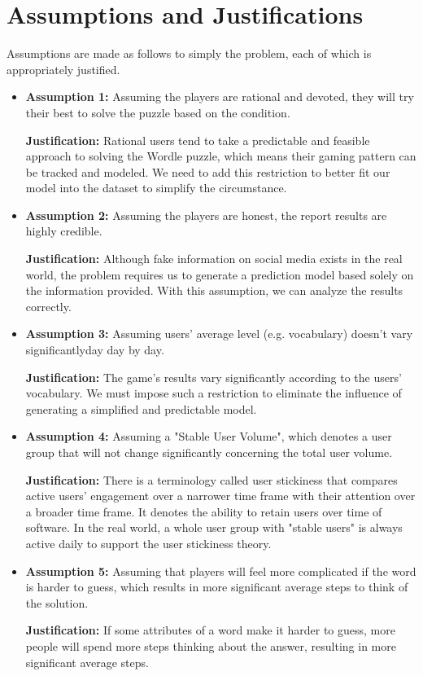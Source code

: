 \documentclass[12pt]{article}
\begin{document}
\section{Assumptions and Justifications}

Assumptions are made as follows to simply the problem, each of which is appropriately justified.

\begin{itemize}
    \item {\textbf{Assumption 1:} Assuming the players are rational and devoted, they will try their best to solve the puzzle based on the condition.}
    
    \textbf{Justification:} Rational users tend to take a predictable  and feasible approach to solving the Wordle puzzle, which means their gaming pattern can be tracked and modeled. We need to add this restriction to better fit our model into the dataset to simplify the circumstance.
    \item {\textbf{Assumption 2:} Assuming the players are honest, the report results are highly credible.}
    
    \textbf{Justification:} Although fake information on social media exists in the real world, the problem requires us to generate a prediction model based solely on the information provided. With this assumption, we can analyze the results correctly.
    \item {\textbf{Assumption 3:} Assuming users' average level (e.g. vocabulary) doesn't vary significantlyday day by day.}

    \textbf{Justification:} The game's results vary significantly according to the users' vocabulary. We must impose such a restriction to eliminate the influence of generating a simplified and predictable model.
    \item {\textbf{Assumption 4:} Assuming a "Stable User Volume", which denotes a user group that will not change significantly concerning the total user volume.}

    \textbf{Justification:} There is a terminology called user stickiness that compares active users' engagement over a narrower time frame with their attention over a broader time frame. It denotes the ability to retain users over time of software. In the real world, a whole user group with "stable users" is always active daily to support the user stickiness theory.
    \item {\textbf{Assumption 5:} Assuming that players will feel more complicated if the word is harder to guess, which results in more significant average steps to think of the solution.}

    \textbf{Justification:} If some attributes of a word make it harder to guess, more people will spend more steps thinking about the answer, resulting in more significant average steps.
\end{itemize}
\end{document}
